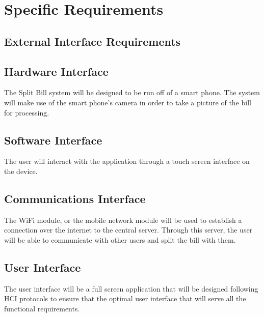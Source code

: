\documentclass[12pt,a4paper]{article}
\begin{document}
   \section{Specific Requirements}
	\subsection{External Interface Requirements}
		\subsection{Hardware Interface}
		The Split Bill system will be designed to be run off of a smart phone. The system will make use of the smart phone's camera in order to take a picture of the bill for processing.
		\subsection{Software Interface}
		The user will interact with the application through a touch screen interface on the device. 
		\subsection{Communications Interface}
		The WiFi module, or the mobile network module will be used to establish a connection over the internet to the central server. Through this server, the user will be able to communicate with other users and split the bill with them.
		\subsection{User Interface}
		The user interface will be a full screen application that will be designed following HCI protocols to ensure that the optimal user interface that will serve all the functional requirements.
\end{document}
